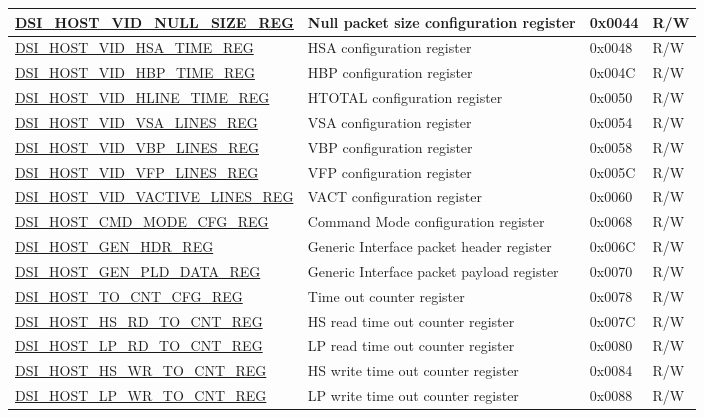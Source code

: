 \begin{longtable}{ | p{6.8cm} | p{7.2cm} | p{1.3cm} | p{1cm} | }
\hyperref[regdesc:DSIHOSTVIDNULLSIZEREG]{DSI\_HOST\_VID\_NULL\_SIZE\_REG} & Null packet size configuration register & 0x0044 & R/W \\ \hline
\hyperref[regdesc:DSIHOSTVIDHSATIMEREG]{DSI\_HOST\_VID\_HSA\_TIME\_REG} & HSA configuration register & 0x0048 & R/W \\ \hline
\hyperref[regdesc:DSIHOSTVIDHBPTIMEREG]{DSI\_HOST\_VID\_HBP\_TIME\_REG} & HBP configuration register & 0x004C & R/W \\ \hline
\hyperref[regdesc:DSIHOSTVIDHLINETIMEREG]{DSI\_HOST\_VID\_HLINE\_TIME\_REG} & HTOTAL configuration register & 0x0050 & R/W \\ \hline
\hyperref[regdesc:DSIHOSTVIDVSALINESREG]{DSI\_HOST\_VID\_VSA\_LINES\_REG} & VSA configuration register & 0x0054 & R/W \\ \hline
\hyperref[regdesc:DSIHOSTVIDVBPLINESREG]{DSI\_HOST\_VID\_VBP\_LINES\_REG} & VBP configuration register & 0x0058 & R/W \\ \hline
\hyperref[regdesc:DSIHOSTVIDVFPLINESREG]{DSI\_HOST\_VID\_VFP\_LINES\_REG} & VFP configuration register & 0x005C & R/W \\ \hline
\hyperref[regdesc:DSIHOSTVIDVACTIVELINESREG]{DSI\_HOST\_VID\_VACTIVE\_LINES\_REG} & VACT configuration register & 0x0060 & R/W \\ \hline
\hyperref[regdesc:DSIHOSTCMDMODECFGREG]{DSI\_HOST\_CMD\_MODE\_CFG\_REG} & Command Mode configuration register & 0x0068 & R/W \\ \hline
\hyperref[regdesc:DSIHOSTGENHDRREG]{DSI\_HOST\_GEN\_HDR\_REG} & Generic Interface packet header register & 0x006C & R/W \\ \hline
\hyperref[regdesc:DSIHOSTGENPLDDATAREG]{DSI\_HOST\_GEN\_PLD\_DATA\_REG} & Generic Interface packet payload register & 0x0070 & R/W \\ \hline
\hyperref[regdesc:DSIHOSTTOCNTCFGREG]{DSI\_HOST\_TO\_CNT\_CFG\_REG} & Time out counter register & 0x0078 & R/W \\ \hline
\hyperref[regdesc:DSIHOSTHSRDTOCNTREG]{DSI\_HOST\_HS\_RD\_TO\_CNT\_REG} & HS read time out counter register & 0x007C & R/W \\ \hline
\hyperref[regdesc:DSIHOSTLPRDTOCNTREG]{DSI\_HOST\_LP\_RD\_TO\_CNT\_REG} & LP read time out counter register & 0x0080 & R/W \\ \hline
\hyperref[regdesc:DSIHOSTHSWRTOCNTREG]{DSI\_HOST\_HS\_WR\_TO\_CNT\_REG} & HS write time out counter register & 0x0084 & R/W \\ \hline
\hyperref[regdesc:DSIHOSTLPWRTOCNTREG]{DSI\_HOST\_LP\_WR\_TO\_CNT\_REG} & LP write time out counter register & 0x0088 & R/W \\ \hline

\end{longtable}
